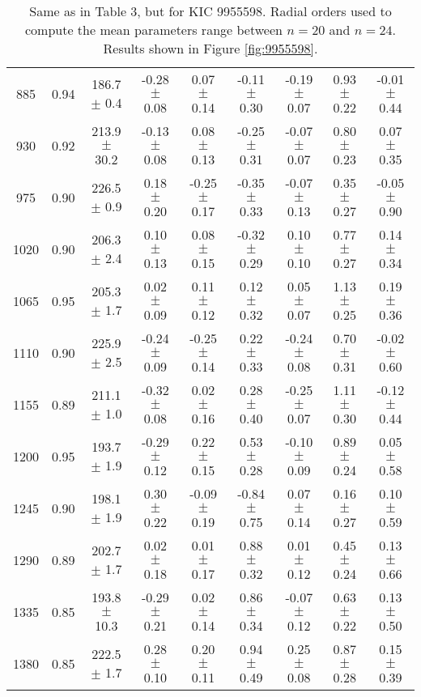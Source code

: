 \documentclass[twocolumn]{aastex61}%
\begin{document}
\begin{table*}[ht]
\begin{tabular}{ccc|ccccc|c}
885 & 0.94 & 186.7 $\pm$ 0.4 & -0.28 $\pm$ 0.08 & 0.07 $\pm$ 0.14 & -0.11 $\pm$ 0.30 & -0.19 $\pm$ 0.07 & 0.93 $\pm$ 0.22 & -0.01 $\pm$ 0.44\\
930 & 0.92 & 213.9 $\pm$ 30.2 & -0.13 $\pm$ 0.08 & 0.08 $\pm$ 0.13 & -0.25 $\pm$ 0.31 & -0.07 $\pm$ 0.07 & 0.80 $\pm$ 0.23 & 0.07 $\pm$ 0.35\\
975 & 0.90 & 226.5 $\pm$ 0.9 & 0.18 $\pm$ 0.20 & -0.25 $\pm$ 0.17 & -0.35 $\pm$ 0.33 & -0.07 $\pm$ 0.13 & 0.35 $\pm$ 0.27 & -0.05 $\pm$ 0.90\\
1020 & 0.90 & 206.3 $\pm$ 2.4 & 0.10 $\pm$ 0.13 & 0.08 $\pm$ 0.15 & -0.32 $\pm$ 0.29 & 0.10 $\pm$ 0.10 & 0.77 $\pm$ 0.27 & 0.14 $\pm$ 0.34\\
1065 & 0.95 & 205.3 $\pm$ 1.7 & 0.02 $\pm$ 0.09 & 0.11 $\pm$ 0.12 & 0.12 $\pm$ 0.32 & 0.05 $\pm$ 0.07 & 1.13 $\pm$ 0.25 & 0.19 $\pm$ 0.36\\
1110 & 0.90 & 225.9 $\pm$ 2.5 & -0.24 $\pm$ 0.09 & -0.25 $\pm$ 0.14 & 0.22 $\pm$ 0.33 & -0.24 $\pm$ 0.08 & 0.70 $\pm$ 0.31 & -0.02 $\pm$ 0.60\\
1155 & 0.89 & 211.1 $\pm$ 1.0 & -0.32 $\pm$ 0.08 & 0.02 $\pm$ 0.16 & 0.28 $\pm$ 0.40 & -0.25 $\pm$ 0.07 & 1.11 $\pm$ 0.30 & -0.12 $\pm$ 0.44\\
1200 & 0.95 & 193.7 $\pm$ 1.9 & -0.29 $\pm$ 0.12 & 0.22 $\pm$ 0.15 & 0.53 $\pm$ 0.28 & -0.10 $\pm$ 0.09 & 0.89 $\pm$ 0.24 & 0.05 $\pm$ 0.58\\
1245 & 0.90 & 198.1 $\pm$ 1.9 & 0.30 $\pm$ 0.22 & -0.09 $\pm$ 0.19 & -0.84 $\pm$ 0.75 & 0.07 $\pm$ 0.14 & 0.16 $\pm$ 0.27 & 0.10 $\pm$ 0.59\\
1290 & 0.89 & 202.7 $\pm$ 1.7 & 0.02 $\pm$ 0.18 & 0.01 $\pm$ 0.17 & 0.88 $\pm$ 0.32 & 0.01 $\pm$ 0.12 & 0.45 $\pm$ 0.24 & 0.13 $\pm$ 0.66\\
1335 & 0.85 & 193.8 $\pm$ 10.3 & -0.29 $\pm$ 0.21 & 0.02 $\pm$ 0.14 & 0.86 $\pm$ 0.34 & -0.07 $\pm$ 0.12 & 0.63 $\pm$ 0.22 & 0.13 $\pm$ 0.50\\
1380 & 0.85 & 222.5 $\pm$ 1.7 & 0.28 $\pm$ 0.10 & 0.20 $\pm$ 0.11 & 0.94 $\pm$ 0.49 & 0.25 $\pm$ 0.08 & 0.87 $\pm$ 0.28 & 0.15 $\pm$ 0.39\\
\end{tabular}
\caption{Same as in Table 3, but for KIC 9955598. Radial orders used to compute the mean parameters range between $n=20$ and $n=24$. Results shown in Figure \ref{fig:9955598}.}\label{tab:9955598}\vspace{-1.5cm}
\end{table*}
\end{document}
